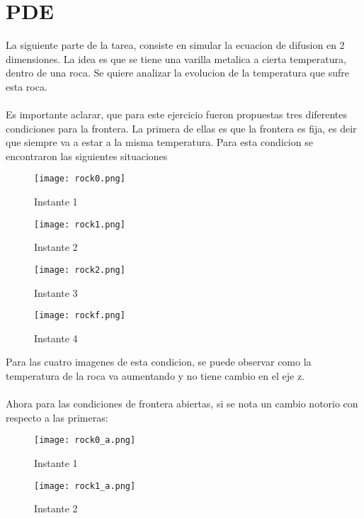 \documentclass{article}[11]
\begin{document}
\section{PDE }
La siguiente parte de la tarea, consiste en simular la ecuacion de difusion en 2 dimensiones. La idea es que se tiene una varilla metalica a cierta temperatura, dentro de una roca. Se quiere analizar la evolucion de la temperatura que sufre esta roca.
\\
\\
Es importante aclarar, que para este ejercicio fueron propuestas tres diferentes condiciones para la frontera. La primera de ellas es que la frontera es fija, es deir que siempre va a estar a la misma temperatura. Para esta condicion se encontraron las siguientes situaciones

\begin{figure}[H]
    \centering
    \texttt{[image: rock0.png]}
    \caption{Instante 1}
    \label{fig:my_label}
\end{figure}

\begin{figure}[H]
    \centering
    \texttt{[image: rock1.png]}
    \caption{Instante 2}
    \label{fig:my_label}
\end{figure}

\begin{figure}[H]
    \centering
    \texttt{[image: rock2.png]}
    \caption{Instante 3}
    \label{fig:my_label}
\end{figure}

\begin{figure}[H]
    \centering
    \texttt{[image: rockf.png]}
    \caption{Instante 4}
    \label{fig:my_label}
\end{figure}

Para las cuatro imagenes de esta condicion, se puede observar como la temperatura de la roca va aumentando y no tiene cambio en el eje z.
\\
\\
Ahora para las condiciones de frontera abiertas, si se nota un cambio notorio con respecto a las primeras:
\begin{figure}[H]
    \centering
    \texttt{[image: rock0\_a.png]}
    \caption{Instante 1}
    \label{fig:my_label}
\end{figure}

\begin{figure}[H]
    \centering
    \texttt{[image: rock1\_a.png]}
    \caption{Instante 2}
    \label{fig:my_label}
\end{figure}
\end{document}
